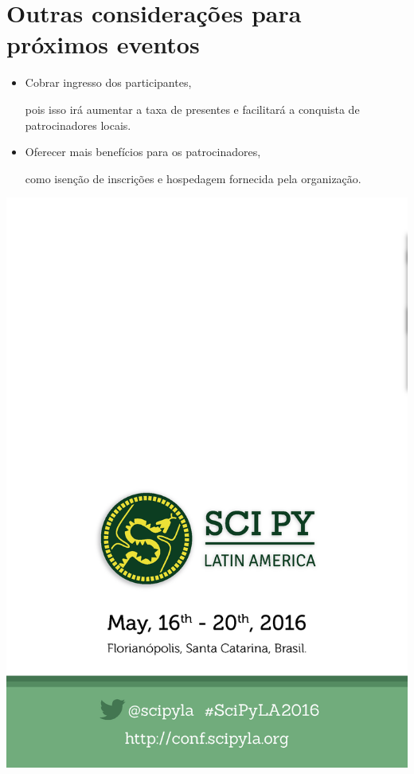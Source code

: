 \documentclass[12pt]{article}
\begin{document}
\newpage

\section*{Outras considerações para próximos eventos}

\begin{itemize}
  \item Cobrar ingresso dos participantes,

    pois isso irá aumentar a taxa de presentes e facilitará a conquista de
    patrocinadores locais.

  \item Oferecer mais benefícios para os patrocinadores,

    como isenção de inscrições e hospedagem fornecida pela organização.

\end{itemize}

\clearpage
\newpage

\thispagestyle{empty}
\noindent  %
\includegraphics{../../assets/contra-capa}
\NoBgThispage
\end{document}
